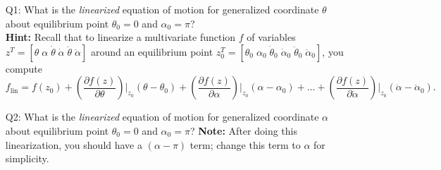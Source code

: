 \documentclass[12pt]{report}
\newcommand\drew[1]{\textcolor{red}{#1}}
\newcommand{\pder}[2]{\frac{\partial #1}{\partial #2}}
\begin{document}
\begin{enumerate}
    \item[Q1:] What is the \emph{linearized} equation of motion for generalized coordinate $\theta$ about equilibrium point $\theta_0 = 0$ and $\alpha_0 = \pi$?\\
          \textbf{Hint:} Recall that to linearize a multivariate function $f$ of variables $z^T = [\theta \; \alpha \; \dot{\theta} \; \dot{\alpha} \; \ddot{\theta} \; \ddot{\alpha}]$ around an equilibrium point $z_{0}^T = [\theta_0 \; \alpha_0 \; \dot{\theta}_0 \; \dot{\alpha}_0 \; \ddot{\theta}_0 \; \ddot{\alpha}_0]$, you compute
          \[
              f_\text{lin} = f(z_0) + \left(\frac{\partial f(z)}{\partial \theta}\right) \bigg|_{z_0}  (\theta - \theta_0) +  \left(\frac{\partial f(z)}{\partial \alpha}\right) \bigg|_{z_0}  (\alpha - \alpha_0) + \dots +  \left(\frac{\partial f(z)}{\partial \ddot{\alpha}}\right) \bigg|_{z_0}  (\ddot{\alpha} - \ddot{\alpha}_0).
          \]
    \item[Q2:] What is the \emph{linearized} equation of motion for generalized coordinate $\alpha$ about equilibrium point $\theta_0 = 0$ and $\alpha_0 = \pi$? \textbf{Note:} After doing this linearization, you should have a $(\alpha-\pi)$ term; change this term to $\alpha$ for simplicity. \\

\end{enumerate}
\end{document}
